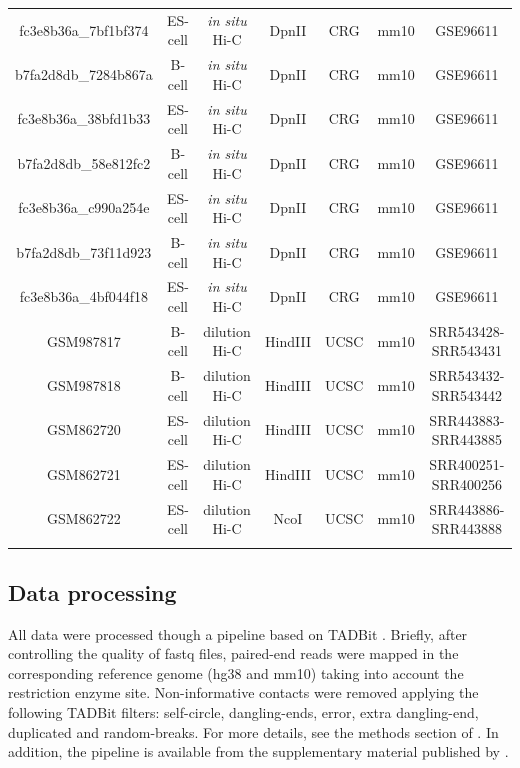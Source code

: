 \documentclass{bioinfo}
\begin{document}
\begin{methods}
\begin{table}
{\begin{tabular}{ccccccc}
fc3e8b36a\_7bf1bf374 & ES-cell & \textit{in situ} Hi-C &
  DpnII & CRG & mm10 & GSE96611 \\
b7fa2d8db\_7284b867a & B-cell  & \textit{in situ} Hi-C &
  DpnII & CRG & mm10 & GSE96611 \\
fc3e8b36a\_38bfd1b33 & ES-cell & \textit{in situ} Hi-C &
  DpnII & CRG & mm10 & GSE96611 \\
b7fa2d8db\_58e812fc2 & B-cell  & \textit{in situ} Hi-C &
  DpnII & CRG & mm10 & GSE96611 \\
fc3e8b36a\_c990a254e & ES-cell & \textit{in situ} Hi-C &
  DpnII & CRG & mm10 & GSE96611 \\
b7fa2d8db\_73f11d923 & B-cell  & \textit{in situ} Hi-C &
  DpnII & CRG & mm10 & GSE96611 \\
fc3e8b36a\_4bf044f18 & ES-cell & \textit{in situ} Hi-C &
  DpnII & CRG & mm10 & GSE96611 \\
GSM987817 & B-cell  & dilution Hi-C &
  HindIII & UCSC & mm10 & SRR543428-SRR543431 \\
GSM987818 & B-cell  & dilution Hi-C &
  HindIII & UCSC & mm10 & SRR543432-SRR543442 \\
GSM862720 & ES-cell & dilution Hi-C &
  HindIII & UCSC & mm10 & SRR443883-SRR443885 \\
GSM862721 & ES-cell & dilution Hi-C &
  HindIII & UCSC & mm10 & SRR400251-SRR400256 \\
GSM862722 & ES-cell & dilution Hi-C &
  NcoI    & UCSC & mm10 & SRR443886-SRR443888 \\
  \botrule
\end{tabular}}{}
\end{table}

\subsection{Data processing}

All data were processed though a pipeline based on TADBit
\citep{serra2016structural}. Briefly, after controlling the quality of
fastq files, paired-end reads were mapped in the corresponding reference
genome (hg38 and mm10) taking into account the restriction enzyme site.
Non-informative contacts were removed applying the following TADBit
filters: self-circle, dangling-ends, error, extra dangling-end, duplicated
and random-breaks. For more details, see the methods section of
\cite{stadhouders2017transcription}. In addition, the pipeline is
available from the supplementary material published by
\cite{quilez2017managing}.


\end{methods}
\end{document}

